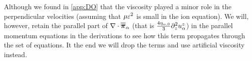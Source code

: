 %
Although we found in \cref{app:DO} that the viscosity played a minor role in the perpendicular velocities (assuming that $\mu \varepsilon^2$ is small in the ion equation).
We will, however, retain the parallel part of $\nabla\cdot\boldsymbol{\overline{\overline{\pi}}}_\alpha$ (that is $\frac{4\eta_{\alpha,0}}{3} \partial_z^2 u^{z}_{\alpha}$) in the parallel momentum equations in the derivations to see how this term propagates through the set of equations.
It the end we will drop the terms and use artificial viscosity instead.
